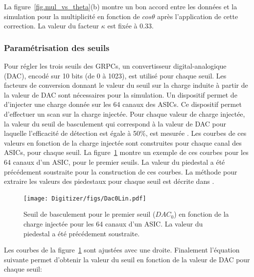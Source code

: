 La figure~\ref{fig.mul_vs_theta}(b) montre un bon accord entre les données et la simulation pour la multiplicité en fonction de $cos\theta$ après l'application de cette correction. La valeur du facteur $\kappa$ est fixée à 0.33.


\subsubsection{Paramétrisation des seuils}
Pour régler les trois seuils des GRPCs, un convertisseur digital-analogique (DAC), encodé sur 10 bits (de 0 à 1023), est utilisé pour chaque seuil. Les facteurs de conversion donnant le valeur du seuil sur la charge induite à partir de la valeur de DAC sont nécessaires pour la simulation. Un dispositif permet de d'injecter une charge donnée sur les 64 canaux des ASICs. Ce dispositif permet d'effectuer un scan sur la charge injectée. Pour chaque valeur de charge injectée, la valeur du seuil de basculement qui correspond à la valeur de DAC pour laquelle l'efficacité de détection est égale à 50\%, est mesurée \cite{kieffer}. Les courbes de ces valeurs en fonction de la charge injectée sont construites pour chaque canal des ASICs, pour chaque seuil. La figure~\ref{dac-vs-inj} montre un exemple de ces courbes pour les 64 canaux d'un ASIC, pour le premier seuils. La valeur du piedestal a été précédement soustraite pour la construction de ces courbes. La méthode pour extraire les valeurs des piedestaux pour chaque seuil est décrite dans \cite{kieffer}.
\begin{figure}[!ht]
  \centering
  \texttt{[image: Digitizer/figs/Dac0Lin.pdf]}
  \caption{Seuil de basculement pour le premier seuil ($DAC_0$) en fonction de la charge injectée pour les 64 canaux d'un ASIC. La valeur du piedestal a été précédement soustraite.}
  \label{dac-vs-inj}
\end{figure}
Les courbes de la figure~\ref{dac-vs-inj} sont ajustées avec une droite. Finalement l'équation suivante permet d'obtenir la valeur du seuil en fonction de la valeur de DAC pour chaque seuil:

